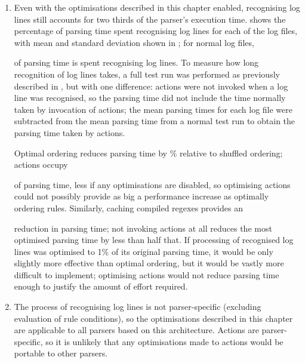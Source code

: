 \begin{enumerate}

    \item Even with the optimisations described in this chapter enabled,
        recognising log lines still accounts for two thirds of the parser's
        execution time.   shows the percentage of parsing time
        spent recognising log lines for each of the \numberOFlogFILES{} log
        files, with mean and standard deviation shown in
        ; for normal log files,
        
        of parsing time is spent recognising log lines.  To measure how
        long recognition of log lines takes, a full test run was performed
        as previously described in , but with
        one difference: actions were not invoked when a log line was
        recognised, so the parsing time did not include the time normally
        taken by invocation of actions; the mean parsing times for each log
        file were subtracted from the mean parsing time from a normal test
        run to obtain the parsing time taken by actions.

        Optimal ordering reduces parsing time by
        \%
        relative to shuffled ordering; actions occupy
        
        of parsing time, less if any optimisations are disabled, so
        optimising actions could not possibly provide as big a performance
        increase as optimally ordering rules.  Similarly, caching compiled
        regexes provides an
        
        reduction in parsing time; not invoking actions at all reduces the
        most optimised parsing time by less than half that.  If processing
        of recognised log lines was optimised to 1\% of its original
        parsing time, it would be only slightly more effective than optimal
        ordering, but it would be vastly more difficult to implement;
        optimising actions would not reduce parsing time enough to justify
        the amount of effort required.

    \item The process of recognising log lines is not parser-specific
        (excluding evaluation of rule conditions), so the optimisations
        described in this chapter are applicable to all parsers based on
        this architecture.  Actions are parser-specific, so it is unlikely
        that any optimisations made to actions would be portable to other
        parsers.

\end{enumerate}

